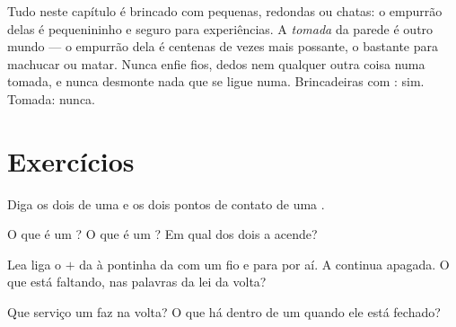 \begin{remark}\label{rem:g3:first-electric-circuit:safety}
Tudo neste capítulo é brincado com  pequenas, redondas ou
chatas: o empurrão delas é pequenininho e seguro para experiências. A
\emph{tomada} da parede é outro mundo --- o empurrão dela é centenas
de vezes mais possante, o bastante para machucar ou matar. Nunca
enfie fios, dedos nem qualquer outra coisa numa tomada, e nunca
desmonte nada que se ligue numa. Brincadeiras com : sim. Tomada:
nunca.
\end{remark}

\section{Exercícios}

\begin{exercise}[$\star$]\label{exo:g3:first-electric-circuit:1}
Diga os dois  de uma  e os dois pontos de contato de
uma .
\end{exercise}

\begin{exercise}[$\star$]\label{exo:g3:first-electric-circuit:2}
O que é um ? O que é um ? Em qual dos
dois a  acende?
\end{exercise}

\begin{exercise}[$\star$]\label{exo:g3:first-electric-circuit:3}
Lea liga o  $+$ da  à pontinha da  com um fio e
para por aí. A  continua apagada. O que está faltando, nas
palavras da lei da volta?
\end{exercise}

\begin{exercise}[$\star$]\label{exo:g3:first-electric-circuit:4}
Que serviço um  faz na volta? O que há dentro de um
 quando ele está fechado?
\end{exercise}

